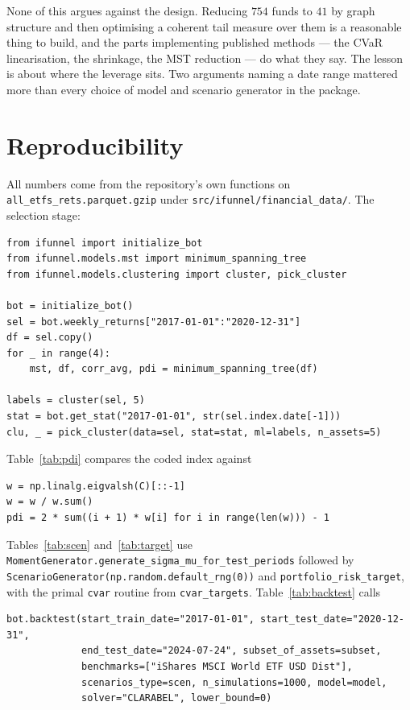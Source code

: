 \documentclass[11pt,a4paper]{article}
\newcommand{\code}[1]{\texttt{#1}}
\begin{document}
None of this argues against the design. Reducing $754$ funds to $41$ by graph
structure and then optimising a coherent tail measure over them is a reasonable
thing to build, and the parts implementing published methods --- the CVaR
linearisation, the shrinkage, the MST reduction --- do what they say. The lesson
is about where the leverage sits. Two arguments naming a date range mattered
more than every choice of model and scenario generator in the package.

\appendix

\section{Reproducibility}
\label{app:repro}

All numbers come from the repository's own functions on
\code{all\_etfs\_rets.parquet.gzip} under \code{src/ifunnel/financial\_data/}.
The selection
stage:

\begin{verbatim}
from ifunnel import initialize_bot
from ifunnel.models.mst import minimum_spanning_tree
from ifunnel.models.clustering import cluster, pick_cluster

bot = initialize_bot()
sel = bot.weekly_returns["2017-01-01":"2020-12-31"]
df = sel.copy()
for _ in range(4):
    mst, df, corr_avg, pdi = minimum_spanning_tree(df)

labels = cluster(sel, 5)
stat = bot.get_stat("2017-01-01", str(sel.index.date[-1]))
clu, _ = pick_cluster(data=sel, stat=stat, ml=labels, n_assets=5)
\end{verbatim}

Table~\ref{tab:pdi} compares the coded index against

\begin{verbatim}
w = np.linalg.eigvalsh(C)[::-1]
w = w / w.sum()
pdi = 2 * sum((i + 1) * w[i] for i in range(len(w))) - 1
\end{verbatim}

Tables~\ref{tab:scen} and~\ref{tab:target} use
\code{MomentGenerator.generate\_sigma\_mu\_for\_test\_periods} followed by
\code{ScenarioGenerator(np.random.default\_rng(0))} and
\code{portfolio\_risk\_target}, with the primal \code{cvar} routine from
\code{cvar\_targets}. Table~\ref{tab:backtest} calls

\begin{verbatim}
bot.backtest(start_train_date="2017-01-01", start_test_date="2020-12-31",
             end_test_date="2024-07-24", subset_of_assets=subset,
             benchmarks=["iShares MSCI World ETF USD Dist"],
             scenarios_type=scen, n_simulations=1000, model=model,
             solver="CLARABEL", lower_bound=0)
\end{verbatim}
\end{document}
